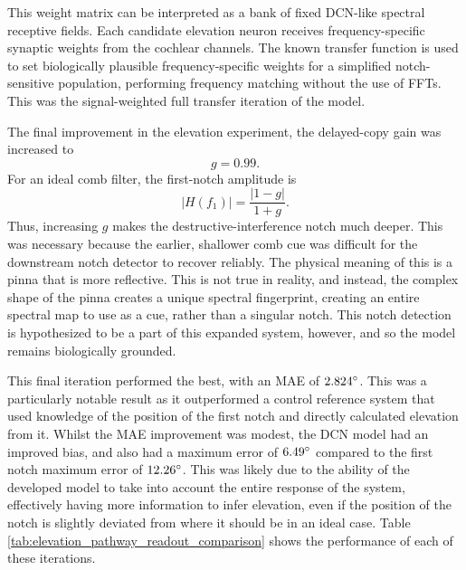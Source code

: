 This weight matrix can be interpreted as a bank of fixed DCN-like spectral receptive fields. Each candidate elevation neuron receives frequency-specific synaptic weights from the cochlear channels. The known transfer function is used to set biologically plausible frequency-specific weights for a simplified notch-sensitive population, performing frequency matching without the use of FFTs. This was the signal-weighted full transfer iteration of the model.

The final improvement in the elevation experiment, the delayed-copy gain was increased to
\begin{equation}
    g = 0.99.
\end{equation}
For an ideal comb filter, the first-notch amplitude is
\begin{equation}
    |H(f_1)| = \frac{|1-g|}{1+g}.
\end{equation}
Thus, increasing $g$ makes the destructive-interference notch much deeper. This was necessary because the earlier, shallower comb cue was difficult for the downstream notch detector to recover reliably. The physical meaning of this is a pinna that is more reflective. This is not true in reality, and instead, the complex shape of the pinna creates a unique spectral fingerprint, creating an entire spectral map to use as a cue, rather than a singular notch. This notch detection is hypothesized to be a part of this expanded system, however, and so the model remains biologically grounded. 

This final iteration performed the best, with an MAE of $2.824\degree$. This was a particularly notable result as it outperformed a control reference system that used knowledge of the position of the first notch and directly calculated elevation from it. Whilst the MAE improvement was modest, the DCN model had an improved bias, and also had a maximum error of $6.49\degree$ compared to the first notch maximum error of $12.26\degree$. This was likely due to the ability of the developed model to take into account the entire response of the system, effectively having more information to infer elevation, even if the position of the notch is slightly deviated from where it should be in an ideal case. Table \ref{tab:elevation_pathway_readout_comparison} shows the performance of each of these iterations.

